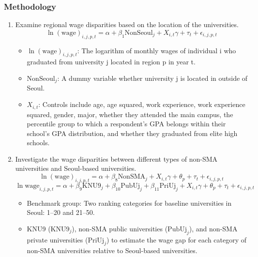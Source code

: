 \documentclass[aspectratio=169,xcolor=dvipsnames,handout]{beamer}
\begin{document}
\begin{frame}[allowframebreaks]
    \frametitle{Methodology}
    \begin{enumerate}[<+->]
        \item Examine regional wage disparities based on the location of the universities.
        \begin{equation}
        \ln{(\text{wage})}_{i,j,p,t} = \alpha + \beta_1 \text{NonSeoul}_j + X_{i,t} \gamma + \tau_t + \epsilon_{i,j,p,t}
        \end{equation}
        \begin{itemize}[<+->]
            \item $\ln{(\text{wage})}_{i,j,p,t}$: The logarithm of monthly wages of individual i who graduated from university j located in region p in year t.
            \item $\text{NonSeoul}_j$: A dummy variable whether university j is located in outside of Seoul.
            \item $X_{i,t}$: Controls include age, age squared, work experience, work experience squared, gender, major, whether they attended the main campus, the percentile group to which a respondent's GPA belongs within their school's GPA distribution, and whether they graduated from elite high schools. 
        \end{itemize}
    \framebreak%
        \item Investigate the wage disparities between different types of non-SMA universities and Seoul-based universities. 
        \begin{equation}
            \ln{(\text{wage})}_{i,j,p,t} = \alpha + \beta_8 \text{NonSMA}_j + X_{i,t} \gamma + \theta_p + \tau_t + \epsilon_{i,j,p,t}
        \end{equation}
        \begin{equation}
            \ln{\text{wage}}_{i,j,p,t} = \alpha + \beta_9 \text{KNU9}_j + \beta_{10} \text{PubUj}_j + \beta_{11} \text{PriUj}_j + X_{i,t} \gamma + \theta_p + \tau_t + \epsilon_{i,j,p,t}
        \end{equation}
        \begin{itemize}[<+->]
            \item Benchmark group: Two ranking categories for baseline universities in Seoul: 1--20 and 21--50.
            \item KNU9 ($\text{KNU9}_j$), non-SMA public universities ($\text{PubUj}_j$), and non-SMA private universities ($\text{PriUj}_j$) to estimate the wage gap for each category of non-SMA universities relative to Seoul-based universities. 

\end{itemize}
\end{enumerate}
\end{frame}
\end{document}
